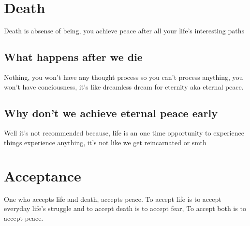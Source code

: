 \documentclass[12pt]{extarticle}
\begin{document}
\section{Death}
Death is absense of being, you achieve peace after all your life's interesting paths

\subsection{What happens after we die}
Nothing, you won't have any thought process so you can't process anything, you won't have conciousness, it's like dreamless dream for eternity aka eternal peace. 

\subsection{Why don't we achieve eternal peace early}
Well it's not recommended because, life is an one time opportunity to experience things experience
anything, it's not like we get reincarnated or smth

\section{Acceptance}
One who accepts life and death, accepts peace. To accept life is to accept everyday life's struggle
and to accept death is to accept fear, To accept both is to accept peace.
\end{document}
